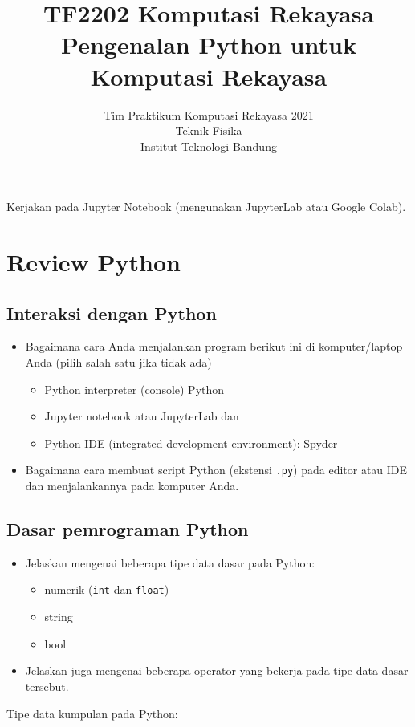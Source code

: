 \documentclass[a4paper,11pt,bahasa]{article} %
\newcommand{\txtinline}[1]{\texttt{#1}}
\begin{document}
\title{%
{\small TF2202 Komputasi Rekayasa}\\
Pengenalan Python untuk Komputasi Rekayasa
}
\author{Tim Praktikum Komputasi Rekayasa 2021\\
Teknik Fisika\\
Institut Teknologi Bandung}
\date{}
\maketitle

Kerjakan pada Jupyter Notebook (mengunakan JupyterLab atau Google Colab).

\section{Review Python}

\subsection{Interaksi dengan Python}

\begin{itemize}
\item Bagaimana cara Anda menjalankan program berikut ini di komputer/laptop Anda
(pilih salah satu jika tidak ada)
  \begin{itemize}
  \item Python interpreter (console) Python
  \item Jupyter notebook atau JupyterLab dan 
  \item Python IDE (integrated development environment): Spyder
  \end{itemize}
\item Bagaimana cara membuat script Python (ekstensi \txtinline{.py}) pada editor
atau IDE dan menjalankannya pada komputer Anda.
\end{itemize}


\subsection{Dasar pemrograman Python}
\begin{itemize}
\item Jelaskan mengenai beberapa tipe data dasar pada Python:
  \begin{itemize}
  \item numerik (\txtinline{int} dan \txtinline{float})
  \item string
  \item bool
  \end{itemize}
\item Jelaskan juga mengenai beberapa operator yang bekerja pada tipe data dasar tersebut.
\end{itemize}
Tipe data kumpulan pada Python:
\end{document}
